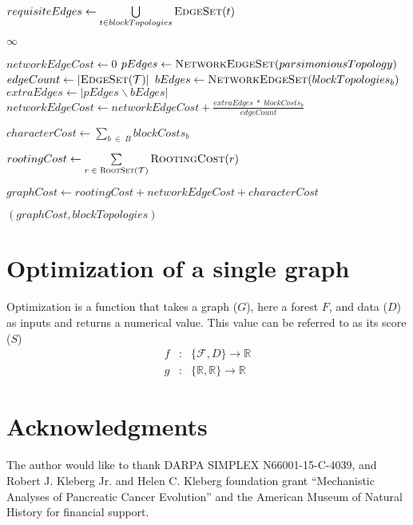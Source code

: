 \documentclass[12pt]{article}
\begin{document}
{\begin{algorithm}
\begin{algorithmic}[1]
		\State $requisiteEdges \gets \bigcup\limits_{t \in blockTopologies} \Call{EdgeSet}{t}$
		
		   \State \Return $\infty$
		\EndIf
		
		\State $networkEdgeCost \gets 0$
		\State $pEdges \gets \Call{NetworkEdgeSet}{parsimoniousTopology}$
		\State $edgeCount \gets |\Call{EdgeSet}{\mathcal{T}}|$
		  \State $bEdges \gets \Call{NetworkEdgeSet}{blockTopologies_b}$
		  \State $extraEdges \gets |pEdges \backslash bEdges |$
		  \State $networkEdgeCost \gets networkEdgeCost + \frac{extraEdges \;*\; blockCosts_b}{edgeCount}$
		\EndFor
		
		\State $characterCost \gets \sum\limits_{b\; \in\; B} blockCosts_{b}$
		
		\State $rootingCost \gets \sum\limits_{r\; \in\; \Call{RootSet}{\mathcal{T}}} \Call{RootingCost}{r}$
		
		\State $graphCost \gets rootingCost + networkEdgeCost + characterCost$

		\State \Return $(graphCost, blockTopologies)$
		\EndFunction
	\end{algorithmic}
\end{algorithm}

\restoregeometry
}


\section{Optimization of a single graph}\label{Optimization of a single graph}

Optimization is a function that takes a graph ($G$), here a forest $F$, and data ($D$) as inputs and returns a numerical value.  
This value can be referred to as its score ($S$)
 	\begin{eqnarray*}
 		f & : &  \{\mathcal{F}, D\} \rightarrow \mathbb{R}\\
		g & : & \{  \mathbb{R},  \mathbb{R} \} \rightarrow \mathbb{R}
	 \end{eqnarray*}
 

\section*{Acknowledgments}
The author would like to thank DARPA SIMPLEX N66001-15-C-4039, and Robert J. Kleberg Jr. and Helen C. Kleberg foundation grant ``Mechanistic Analyses of Pancreatic Cancer Evolution'' and the American Museum of Natural History for financial support. 

%
%
\newpage
%

%
\end{document}
